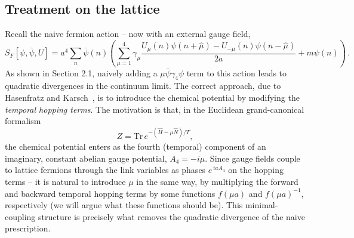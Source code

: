 \documentclass[11pt]{article}
\theoremstyle{definition}
\begin{document}
\subsection{Treatment on the lattice}
Recall the naive fermion action -- now with an external gauge field,
\begin{equation}
    S_F[\psi,\bar{\psi}, U] = a^4 \displaystyle\sum_{n}\bar{\psi}(n) \left(\displaystyle\sum^4_{\mu=1} \gamma_{\mu} \frac{U_{\mu}(n) \psi(n+\hat{\mu}) - U_{-\mu}(n) \psi(n-\hat{\mu})}{2 a}  + m\psi(n)\right) \,.
\end{equation}
As shown in Section 2.1, naively adding a $\mu \bar{\psi} \gamma_4 \psi$ term to this action leads to quadratic divergences in the continuum limit. The correct approach, due to
Hasenfratz and Karsch~\cite{Hasenfratz:1983ba}, is to introduce the
chemical potential by modifying the \textit{temporal hopping terms}.
The motivation is that, in the Euclidean grand-canonical formalism
\begin{equation}
  Z = \mathrm{Tr}\,e^{-(\hat{H}-\mu\hat{N})/T},
\end{equation}
the chemical potential enters as the fourth (temporal) component of an
imaginary, constant abelian gauge potential, $A_4 = -i\mu$. Since gauge fields couple to lattice fermions through the link variables as
phases $e^{\,i a A_4}$ on the hopping terms -- it is natural to
introduce $\mu$ in the same way, by multiplying the forward and backward
temporal hopping terms by some functions $f(\mu a)$ and $f(\mu a)^{-1}$,
respectively (we will argue what these functions should be). This minimal-coupling structure is precisely what removes
the quadratic divergence of the naive prescription.
\end{document}
